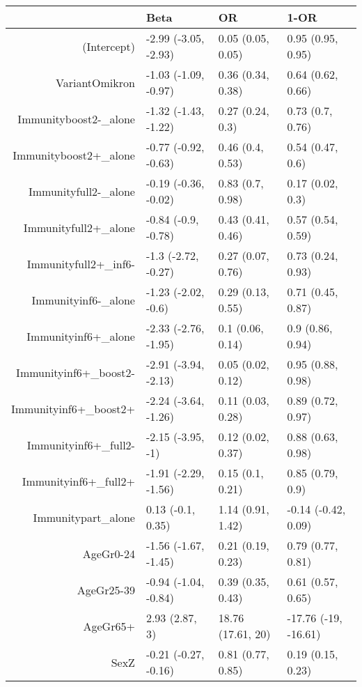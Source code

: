 \begin{table}[ht]
\centering
\begin{tabular}{rlll}
  \hline
 & Beta & OR & 1-OR \\ 
  \hline
(Intercept) & -2.99 (-3.05, -2.93) & 0.05 (0.05, 0.05) & 0.95 (0.95, 0.95) \\ 
  VariantOmikron & -1.03 (-1.09, -0.97) & 0.36 (0.34, 0.38) & 0.64 (0.62, 0.66) \\ 
  Immunityboost2-\_alone & -1.32 (-1.43, -1.22) & 0.27 (0.24, 0.3) & 0.73 (0.7, 0.76) \\ 
  Immunityboost2+\_alone & -0.77 (-0.92, -0.63) & 0.46 (0.4, 0.53) & 0.54 (0.47, 0.6) \\ 
  Immunityfull2-\_alone & -0.19 (-0.36, -0.02) & 0.83 (0.7, 0.98) & 0.17 (0.02, 0.3) \\ 
  Immunityfull2+\_alone & -0.84 (-0.9, -0.78) & 0.43 (0.41, 0.46) & 0.57 (0.54, 0.59) \\ 
  Immunityfull2+\_inf6- & -1.3 (-2.72, -0.27) & 0.27 (0.07, 0.76) & 0.73 (0.24, 0.93) \\ 
  Immunityinf6-\_alone & -1.23 (-2.02, -0.6) & 0.29 (0.13, 0.55) & 0.71 (0.45, 0.87) \\ 
  Immunityinf6+\_alone & -2.33 (-2.76, -1.95) & 0.1 (0.06, 0.14) & 0.9 (0.86, 0.94) \\ 
  Immunityinf6+\_boost2- & -2.91 (-3.94, -2.13) & 0.05 (0.02, 0.12) & 0.95 (0.88, 0.98) \\ 
  Immunityinf6+\_boost2+ & -2.24 (-3.64, -1.26) & 0.11 (0.03, 0.28) & 0.89 (0.72, 0.97) \\ 
  Immunityinf6+\_full2- & -2.15 (-3.95, -1) & 0.12 (0.02, 0.37) & 0.88 (0.63, 0.98) \\ 
  Immunityinf6+\_full2+ & -1.91 (-2.29, -1.56) & 0.15 (0.1, 0.21) & 0.85 (0.79, 0.9) \\ 
  Immunitypart\_alone & 0.13 (-0.1, 0.35) & 1.14 (0.91, 1.42) & -0.14 (-0.42, 0.09) \\ 
  AgeGr0-24 & -1.56 (-1.67, -1.45) & 0.21 (0.19, 0.23) & 0.79 (0.77, 0.81) \\ 
  AgeGr25-39 & -0.94 (-1.04, -0.84) & 0.39 (0.35, 0.43) & 0.61 (0.57, 0.65) \\ 
  AgeGr65+ & 2.93 (2.87, 3) & 18.76 (17.61, 20) & -17.76 (-19, -16.61) \\ 
  SexZ & -0.21 (-0.27, -0.16) & 0.81 (0.77, 0.85) & 0.19 (0.15, 0.23) \\ 
   \hline
\end{tabular}
\end{table}
